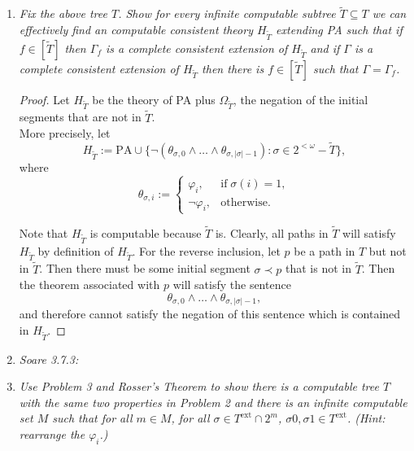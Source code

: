 \documentclass{article}
\begin{document}
\begin{enumerate}[label={\bf Q\arabic*:}]
  \item \it Fix the above tree $T$. Show for every infinite computable
    subtree $\tilde{T}\subseteq T$ we can effectively find an computable
    consistent theory $H_{\tilde{T}}$ extending PA such that if
    $f\in[\tilde{T}]$ then $\Gamma_f$ is a complete consistent extension of
    $H_{\tilde{T}}$ and if $\Gamma$ is a complete consistent extension of
    $H_{\tilde{T}}$ then there is $f\in[\tilde{T}]$ such that
    $\Gamma=\Gamma_f$.

    \begin{proof}
      Let $H_{\tilde{T}}$ be the theory of PA plus $\Omega_{\tilde{T}}$,
      the negation of the initial segments that are not in $\tilde{T}$. \\

      More precisely, let
      \[H_{\tilde{T}} :=\text{PA} \cup \{\neg(\theta_{\sigma,0}
      \wedge\ldots \wedge\theta_{\sigma,|\sigma|-1}): \sigma\in
      2^{<\omega}-\tilde{T}\},\]
      where
      \begin{equation*}
        \theta_{\sigma,i} :=
        \begin{cases}
          \varphi_i, &\text{if}\; \sigma(i)=1,\\
          \neg\varphi_i, &\text{otherwise}.
        \end{cases}
      \end{equation*}

      Note that $H_{\tilde{T}}$ is computable because $\tilde{T}$ is.
      Clearly, all paths in $\tilde{T}$ will satisfy $H_{\tilde{T}}$ by
      definition of $H_{\tilde{T}}$. For the reverse inclusion, let $p$ be
      a path in $T$ but not in $\tilde{T}$. Then there must be some initial
      segment $\sigma\prec p$ that is not in $\tilde{T}$. Then the theorem
      associated with $p$ will satisfy the sentence \[\theta_{\sigma,0}
      \wedge\ldots \wedge\theta_{\sigma,|\sigma|-1},\] and therefore cannot
      satisfy the negation of this sentence which is contained in
      $H_{\tilde{T}}$.
    \end{proof}

  \item \it Soare 3.7.3:

  \item \it Use Problem 3 and Rosser's Theorem to show there is a
    computable tree $T$ with the same two properties in Problem 2 and there
    is an infinite computable set $M$ such that for all $m\in M$, for all
    $\sigma\in T^{\text{ext}}\cap2^m$, $\sigma0,\sigma1\in T^{\text{ext}}$.
    (Hint: rearrange the $\varphi_i$.)


\end{enumerate}
\end{document}
